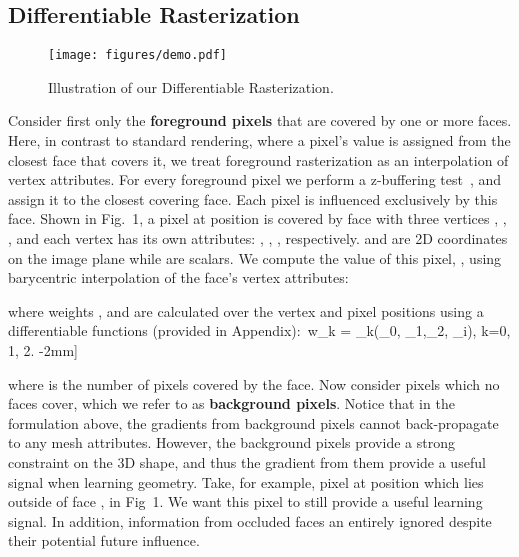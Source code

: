 \documentclass{article}
\newcommand{\vertexdatas}{attributes}
\begin{document}
\vspace{-6pt}
\subsection{Differentiable Rasterization}
\vspace{-5pt}

\begin{wrapfigure}{R}{0.25\textwidth} 
\centering
\vspace{-14pt}
\texttt{[image: figures/demo.pdf]}
\vspace{-15pt}
 \label{fig:demonstrate}
 \caption{\footnotesize Illustration of our Differentiable Rasterization.}
\end{wrapfigure}
Consider first only the \textbf{foreground pixels} that are covered by one or more faces. Here, in contrast to standard rendering, where a pixel's value is assigned from the closest face that covers it, we treat foreground rasterization as an interpolation of vertex \vertexdatas  \cite{genova2018unsupervised}. For every foreground pixel we perform a z-buffering test~\cite{greene1993hierarchical}, and assign it to the closest covering face. Each pixel is influenced exclusively by this face. Shown in Fig.~1, a pixel at position  is covered by face  with three vertices , , , and each vertex has its own \vertexdatas: , , , respectively.  and   are 2D coordinates on the image plane while  are  scalars. We compute the value of this pixel, , using barycentric interpolation of the face's vertex \vertexdatas:

where weights ,  and  are calculated over the vertex and pixel positions using a differentiable functions  (provided in Appendix):\
    w_k = \Omega_k(_{0}, _{1},_{2}, _i), \quad k=0, 1, 2.
\label{equation:wfunc}
-2mm]


where  is the number of pixels covered by the face. Now consider pixels which no faces cover, which we refer to as \textbf{background pixels}. Notice that in the formulation above, the gradients from background pixels cannot back-propagate to any mesh \vertexdatas. However, the background pixels provide a strong constraint on the 3D shape, and thus the gradient from them provide a useful signal when learning geometry. Take, for example, pixel  at position  which lies outside of face , in Fig~1. We want this pixel to still provide a useful learning signal. In addition, information from occluded faces an entirely ignored despite their potential future influence.
\end{document}
